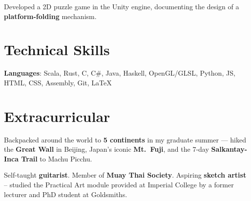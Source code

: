 \documentclass{article}
\begin{document}
{Developed a 2D puzzle game in the Unity engine, documenting the design of a \textbf{platform-folding} mechanism.}



\section*{Technical Skills}

\textbf{Languages}: Scala, Rust, C, C\#, Java, Haskell, OpenGL/GLSL, Python, JS, HTML, CSS, Assembly, Git, LaTeX



\section*{Extracurricular}

Backpacked around the world to \textbf{5 continents} in my graduate summer --- hiked the \textbf{Great Wall} in Beijing, Japan's iconic \textbf{Mt.\ Fuji}, and the 7-day \textbf{Salkantay-Inca Trail} to Machu Picchu.

\medskip

Self-taught \textbf{guitarist}. Member of \textbf{Muay Thai Society}. Aspiring \textbf{sketch artist} -- studied the Practical Art module provided at Imperial College by a former lecturer and PhD student at Goldsmiths. 


\end{document}
